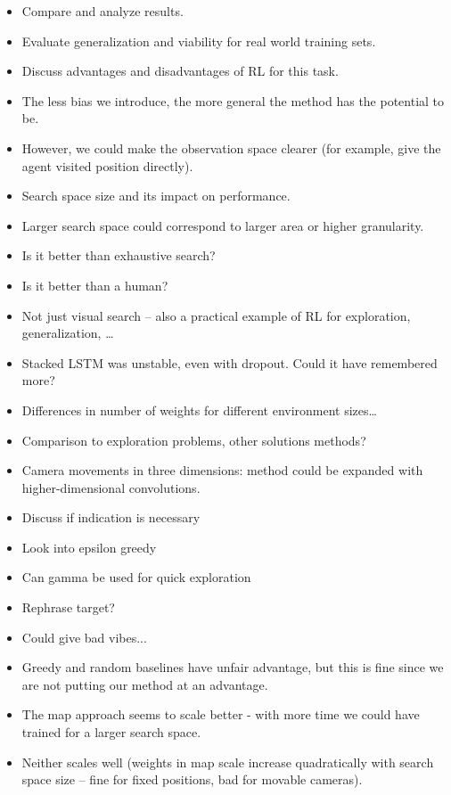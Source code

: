 \begin{itemize}
    \item Compare and analyze results.
    \item Evaluate generalization and viability for real world training sets. 
    \item Discuss advantages and disadvantages of RL for this task.
    \item The less bias we introduce, the more general the method has the potential to be.
    \item However, we could make the observation space clearer (for example, give the agent visited position directly).
    \item Search space size and its impact on performance.
    \item Larger search space could correspond to larger area or higher granularity.
    \item Is it better than exhaustive search?
    \item Is it better than a human?
    \item Not just visual search -- also a practical example of RL for exploration, generalization, \dots
    \item Stacked LSTM was unstable, even with dropout. Could it have remembered more?
    \item Differences in number of weights for different environment sizes\dots
    \item Comparison to exploration problems, other solutions methods?
    \item Camera movements in three dimensions: method could be expanded with higher-dimensional convolutions. 
    \item Discuss if indication is necessary
    \item Look into epsilon greedy
    \item Can gamma be used for quick exploration
    \item Rephrase target?
    \item Could give bad vibes...
    \item Greedy and random baselines have unfair advantage, but this is fine since we are not putting our method at an advantage.
    \item The map approach seems to scale better - with more time we could have trained for a larger search space.
    \item Neither scales well (weights in map scale increase quadratically with search space size -- fine for fixed positions, bad for movable cameras).

\end{itemize}
